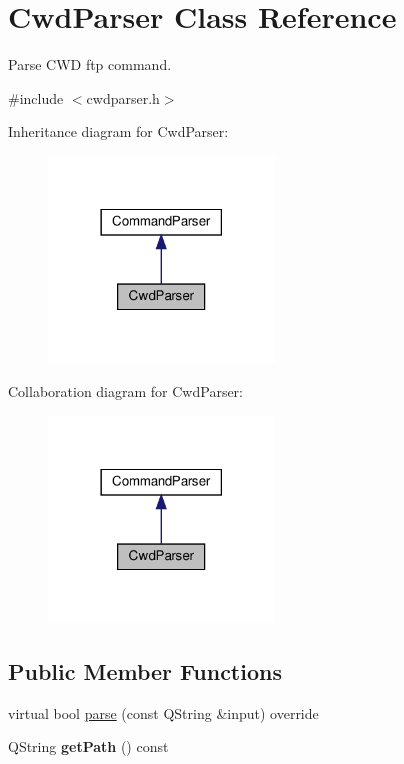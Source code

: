 \hypertarget{classCwdParser}{}\section{Cwd\+Parser Class Reference}
\label{classCwdParser}


Parse C\+WD ftp command.  




{\ttfamily \#include $<$cwdparser.\+h$>$}



Inheritance diagram for Cwd\+Parser\+:\nopagebreak
\begin{figure}[H]
\begin{center}
\leavevmode
\includegraphics[width=170pt]{dc/d0e/classCwdParser__inherit__graph}
\end{center}
\end{figure}


Collaboration diagram for Cwd\+Parser\+:\nopagebreak
\begin{figure}[H]
\begin{center}
\leavevmode
\includegraphics[width=170pt]{dc/dc7/classCwdParser__coll__graph}
\end{center}
\end{figure}
\subsection*{Public Member Functions}
\begin{DoxyCompactItemize}
\item 
virtual bool \hyperlink{classCwdParser_a4037186e2a7229bc7499f138a559d47b}{parse} (const Q\+String \&input) override
\item 
\mbox{\label{classCwdParser_acfd6d9d6ec74418cb3176144541d3c6a}} 
Q\+String {\bfseries get\+Path} () const
\end{DoxyCompactItemize}


